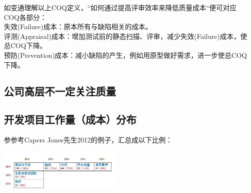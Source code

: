 如变通理解以上COQ定义，``如何通过提高评审效率来降低质量成本``便可对应COQ各部分：\\
失效(Failure)成本：原本所有与缺陷相关的成本。\\
评测(Appraisal)成本：增加测试前的静态扫描、评审，减少失效(Failure)成本，使总COQ下降。\\
预防(Prevention)成本：减小缺陷的产生，例如用原型做好需求，进一步使总COQ下降。\\

\hypertarget{ux516cux53f8ux9ad8ux5c42ux4e0dux4e00ux5b9aux5173ux6ce8ux8d28ux91cf}{%
\subsection{公司高层不一定关注质量}\label{ux516cux53f8ux9ad8ux5c42ux4e0dux4e00ux5b9aux5173ux6ce8ux8d28ux91cf}}


\hypertarget{ux5f00ux53d1ux9879ux76eeux5de5ux4f5cux91cfux6210ux672cux5206ux5e03}{%
\subsection{开发项目工作量（成本）分布}\label{ux5f00ux53d1ux9879ux76eeux5de5ux4f5cux91cfux6210ux672cux5206ux5e03}}

参参考Capers Jones先生2012的例子，汇总成以下比例：

\includegraphics[width=6cm]{AR1成本占比.jpg}

